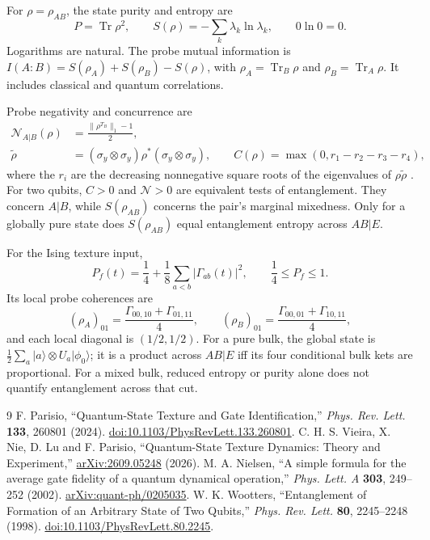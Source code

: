 \documentclass[11pt,a4paper]{article}
\newcommand{\ket}[1]{\lvert #1\rangle}
\newcommand{\Tr}{\operatorname{Tr}}
\begin{document}
For $\rho=\rho_{AB}$, the state purity and entropy are
\begin{equation}
 P=\Tr\rho^2,\qquad S(\rho)=-\sum_k\lambda_k\ln\lambda_k,
 \qquad 0\ln0=0.
\end{equation}
Logarithms are natural. The probe mutual information is
$I(A:B)=S(\rho_A)+S(\rho_B)-S(\rho)$, with
$\rho_A=\Tr_B\rho$ and $\rho_B=\Tr_A\rho$. It includes classical
and quantum correlations.

Probe negativity and concurrence are
\begin{align}
 \mathcal N_{A|B}(\rho)&=\frac{\|\rho^{T_B}\|_1-1}{2},\\
 \widetilde\rho&=(\sigma_y\otimes\sigma_y)\rho^*
 (\sigma_y\otimes\sigma_y),\qquad
 C(\rho)=\max(0,r_1-r_2-r_3-r_4),
\end{align}
where the $r_i$ are the decreasing nonnegative square roots of the
eigenvalues of $\rho\widetilde\rho$ \cite{Wootters1998}.
For two qubits, $C>0$ and $\mathcal N>0$ are equivalent tests of
entanglement. They concern $A|B$, while $S(\rho_{AB})$ concerns the
pair's marginal mixedness. Only for a globally pure state does
$S(\rho_{AB})$ equal entanglement entropy across $AB|E$.

For the Ising texture input,
\begin{equation}
 P_f(t)=\frac14+\frac18\sum_{a<b}|\Gamma_{ab}(t)|^2,
 \qquad \frac14\le P_f\le1.
\end{equation}
Its local probe coherences are
\begin{equation}
 (\rho_A)_{01}=\frac{\Gamma_{00,10}+\Gamma_{01,11}}4,
 \qquad (\rho_B)_{01}=\frac{\Gamma_{00,01}+\Gamma_{10,11}}4,
\end{equation}
and each local diagonal is $(1/2,1/2)$.
For a pure bulk, the global state is
$\frac12\sum_a\ket a\otimes U_a\ket{\phi_0}$; it is a product
across $AB|E$ iff its four conditional bulk kets are proportional.
For a mixed bulk, reduced entropy or purity alone does not quantify
entanglement across that cut.

\begin{thebibliography}{9}
F. Parisio, ``Quantum-State Texture and Gate Identification,''
\emph{Phys. Rev. Lett.} \textbf{133}, 260801 (2024).
\href{https://doi.org/10.1103/PhysRevLett.133.260801}{doi:10.1103/PhysRevLett.133.260801}.
C. H. S. Vieira, X. Nie, D. Lu and F. Parisio,
``Quantum-State Texture Dynamics: Theory and Experiment,''
\href{https://arxiv.org/abs/2609.05248}{arXiv:2609.05248} (2026).
M. A. Nielsen, ``A simple formula for the average gate fidelity of a
quantum dynamical operation,'' \emph{Phys. Lett. A} \textbf{303},
249--252 (2002).
\href{https://arxiv.org/abs/quant-ph/0205035}{arXiv:quant-ph/0205035}.
W. K. Wootters, ``Entanglement of Formation of an Arbitrary State of Two
Qubits,'' \emph{Phys. Rev. Lett.} \textbf{80}, 2245--2248 (1998).
\href{https://doi.org/10.1103/PhysRevLett.80.2245}{doi:10.1103/PhysRevLett.80.2245}.
\end{thebibliography}
\end{document}
